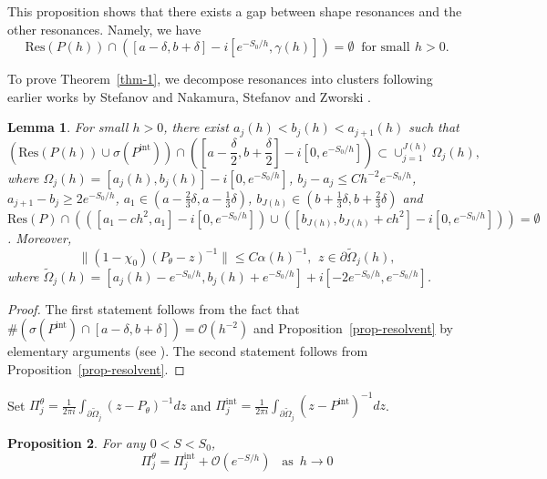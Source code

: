 \documentclass{article}
\theoremstyle{plain}
\newtheorem{prop}{Proposition}[section]
\newtheorem{lemma}[prop]{Lemma}
\theoremstyle{definition}
\theoremstyle{remark}
\begin{document}
This proposition shows that there exists a gap between shape resonances and the other resonances. 
Namely, we have  
\[\mathrm{Res}(P(h))\cap ([a-\delta, b+\delta]-i[e^{-S_0/h}, \gamma(h)])
=\emptyset\mspace{10mu}\text{for small}\mspace{7mu} h>0.\]



To prove Theorem~\ref{thm-1}, we decompose resonances into clusters following earlier 
works by Stefanov \cite{S2} and Nakamura, Stefanov and Zworski \cite{NSZ}.
\begin{lemma}\label{lemma-cluster}
For small $h>0$, there exist $a_j(h)<b_j(h)<a_{j+1}(h)$ such that 
\[\left(\mathrm{Res}(P(h))\cup 
\sigma(P^{\mathrm{int}})\right)\cap ([a-\frac{\delta}{2}, b+\frac{\delta}{2}]-i[0, e^{-S_0/h}])
\subset \cup_{j=1}^{J(h)}\Omega_j(h),\]
where $\Omega_j(h)=[a_j(h), b_j(h)]-i[0, e^{-S_0/h}]$, 
$b_j-a_j\le Ch^{-2}e^{-S_0/h}$, $a_{j+1}-b_j\ge 2e^{-S_0/h}$, 
$a_1\in(a-\frac{2}{3}\delta, a-\frac{1}{3}\delta)$, $b_{J(h)}\in (b+\frac{1}{3}\delta,b+\frac{2}{3}\delta)$ and 
$\mathrm{Res}(P)\cap(([a_1-ch^2, a_1]-i[0, e^{-S_0/h}])
\cup ([b_{J(h)}, b_{J(h)}+ch^2]-i[0, e^{-S_0/h}]))
=\emptyset$.
Moreover, 
\[\|(1-\chi_0)(P_{\theta}-z)^{-1}\|\le C\alpha(h)^{-1},\mspace{7mu} z\in \partial \widetilde{\Omega}_j(h),\]
where $\widetilde{\Omega}_j(h)=[a_j(h)-e^{-S_0/h}, 
b_j(h)+e^{-S_0/h}]+i[-2e^{-S_0/h}, e^{-S_0/h}]$.
\end{lemma}
\begin{proof}
The first statement follows from the fact that 
$\# (\sigma(P^{\mathrm{int}})\cap [a-\delta, b+\delta])=\mathcal{O}(h^{-2})$ and 
Proposition~\ref{prop-resolvent} by elementary arguments (see \cite{NSZ}). 
The second statement follows from Proposition~\ref{prop-resolvent}.
\end{proof}

Set $ \Pi_j^{\theta}=\frac{1}{2\pi i}\int_{\partial \widetilde{\Omega}_j} (z-P_{\theta})^{-1}dz$ and 
$ \Pi_j^{\mathrm{int}}=\frac{1}{2\pi i}\int_{\partial \widetilde{\Omega}_j} (z-P^{\mathrm{int}})^{-1}dz$. 

\begin{prop}\label{prop-projection}
For any $0<S<S_0$, 
\[ 
\Pi_j^{\theta}= \Pi_j^{\mathrm{int}}+\mathcal{O}(e^{-S/h})\,\,\,\,\,\mathrm{as} \,\,\,h\to 0
\]

\end{prop}
\end{document}

